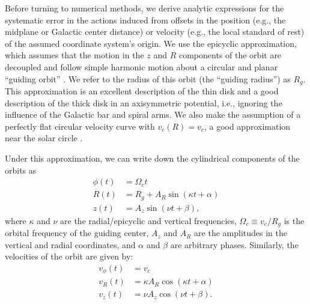 \documentclass[twocolumn]{aastex62}
\newcommand{\beq}{\begin{equation}}
\newcommand{\eeq}{\end{equation}}
\begin{document}
Before turning to numerical methods, we derive analytic expressions for the
systematic error in the actions induced from offsets in the position (e.g., the midplane or
Galactic center distance) or velocity (e.g., the local standard of rest) of the assumed coordinate system's origin. We use the epicyclic approximation, which
assumes that the motion in the $z$ and $R$ components of the orbit are
decoupled and follow simple harmonic motion about a circular and planar
``guiding orbit'' \citep[][Section~3.2 and references
therein]{2008gady.book.....B}. We refer to the radius of this orbit (the
``guiding radius'') as $R_g$. This approximation is an excellent description
of the thin disk and a good description of the thick disk in
an axisymmetric potential, i.e., ignoring the influence of the Galactic bar and
spiral arms. We also make the assumption of a perfectly flat circular
velocity curve with $v_c(R) = v_c$, a good approximation near the solar circle
\citep[e.g.,][]{2017MNRAS.465...76M}.

Under this approximation, we can write down the cylindrical components
of the orbits as
\beq\label{eq:orbits_epi}
\begin{split}
\phi(t) &= \Omega_c t \\
R(t) &= R_g + A_R \sin{(\kappa t + \alpha)} \\
z(t) &= A_z \sin{(\nu t + \beta)}
\text{,}
\end{split}
\eeq
where $\kappa$ and $\nu$ are the radial/epicyclic and vertical frequencies, $\Omega_c
\equiv v_c/R_g$ is the orbital frequency of the guiding center, $A_z$ and $A_R$ are the amplitudes in the vertical and radial coordinates, and $\alpha$ and
$\beta$ are arbitrary phases. Similarly, the velocities of the orbit are
given by:
\beq\label{eq:orbits_vel_epi}
\begin{split}
v_{\phi}(t) &= v_c \\
v_R(t) &= \kappa A_R \cos{(\kappa t + \alpha)} \\
v_z(t) &= \nu A_z \cos{(\nu t + \beta)}
\text{.}
\end{split}
\eeq
\end{document}
